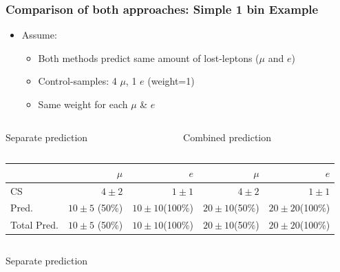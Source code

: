 \documentclass{beamer}
\begin{document}
\begin{frame}
  \frametitle{Comparison of both approaches: Simple 1 bin Example}
  \begin{itemize}
   \item Assume:
   \begin{itemize}
    \item Both methods predict same amount of lost-leptons ($\mu$ and $e$)
    \item Control-samples: 4 $\mu$, 1 $e$ (weight=1)
    \item Same weight for each $\mu$ \& $e$ 
   \end{itemize}

  \end{itemize}
  \begin{columns}
   \begin{column}{0.5\textwidth}
   \begin{center}
    Separate prediction
   \end{center}

   \end{column}
   \begin{column}{0.5\textwidth}
    \begin{center}
    Combined prediction
    \end{center}
   \end{column}

  \end{columns}

  \scriptsize
  \begin{tabular}{l|r|r||r|r}

                                                  &           $\mu$            &           $e$  &             $\mu$            &           $e$  \\
\midrule 
     CS &                $4\pm2$ &             $1\pm1$ &              $4\pm2$ &             $1\pm1$  \\ \hline
      Pred.    &          $10\pm5$ (50\%) &              $10\pm10$(100\%)&              $20\pm10$(50\%)&                 $20\pm20$(100\%) \\
      Total Pred. &      $10\pm5$ (50\%) &              $10\pm10$(100\%)&              $20\pm10$(50\%)&                 $20\pm20$(100\%) \\
\bottomrule
\end{tabular}
  \begin{columns}
   \begin{column}{0.5\textwidth}
   \begin{center}
    Separate prediction
   \end{center}


\end{column}
\end{columns}
\end{frame}
\end{document}
